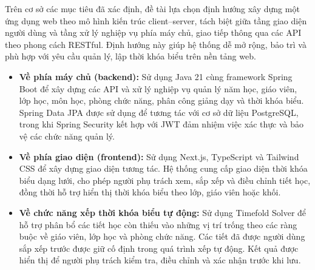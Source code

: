 \documentclass[../DoAn.tex]{subfiles}
\begin{document}

Trên cơ sở các mục tiêu đã xác định, đề tài lựa chọn định hướng xây dựng một ứng dụng web theo mô hình kiến trúc client--server, tách biệt giữa tầng giao diện người dùng và tầng xử lý nghiệp vụ phía máy chủ, giao tiếp thông qua các API theo phong cách RESTful. Định hướng này giúp hệ thống dễ mở rộng, bảo trì và phù hợp với yêu cầu quản lý, lập thời khóa biểu trên nền tảng web.

\begin{itemize}
    \item \textbf{Về phía máy chủ (backend):}
    Sử dụng Java 21 cùng framework Spring Boot để xây dựng các API và xử lý nghiệp vụ quản lý năm học, giáo viên, lớp học, môn học, phòng chức năng, phân công giảng dạy và thời khóa biểu. Spring Data JPA được sử dụng để tương tác với cơ sở dữ liệu PostgreSQL, trong khi Spring Security kết hợp với JWT đảm nhiệm việc xác thực và bảo vệ các chức năng quản lý.

    \item \textbf{Về phía giao diện (frontend):}
    Sử dụng Next.js, TypeScript và Tailwind CSS để xây dựng giao diện tương tác. Hệ thống cung cấp giao diện thời khóa biểu dạng lưới, cho phép người phụ trách xem, sắp xếp và điều chỉnh tiết học, đồng thời hỗ trợ hiển thị thời khóa biểu theo lớp, giáo viên hoặc khối.

    \item \textbf{Về chức năng xếp thời khóa biểu tự động:}
    Sử dụng Timefold Solver để hỗ trợ phân bổ các tiết học còn thiếu vào những vị trí trống theo các ràng buộc về giáo viên, lớp học và phòng chức năng. Các tiết đã được người dùng sắp xếp trước được giữ cố định trong quá trình xếp tự động. Kết quả được hiển thị để người phụ trách kiểm tra, điều chỉnh và xác nhận trước khi lưu.
\end{itemize}
\end{document}
